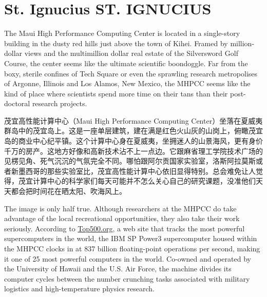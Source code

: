 \chapter{\ifdefined\eng
St. Ignucius
\fi
\ifdefined\chs
ST. IGNUCIUS\fi}
\thispagestyle{empty}
\ifdefined\eng
The Maui High Performance Computing Center is located in a single-story building in the dusty red hills just above the town of Kihei. Framed by million-dollar views and the multimillion dollar real estate of the Silversword Golf Course, the center seems like the ultimate scientific boondoggle. Far from the boxy, sterile confines of Tech Square or even the sprawling research metropolises of Argonne, Illinois and Los Alamos, New Mexico, the MHPCC seems like the kind of place where scientists spend more time on their tans than their post-doctoral research projects.
\fi

\ifdefined\chs
茂宜高性能计算中心（Maui High Performance Computing Center）坐落在夏威夷群岛中的茂宜岛上。这是一座单层建筑，建在满是红色火山灰的山岗上，俯瞰茂宜岛的商业中心纪平镇。这个计算中心身在夏威夷，坐拥迷人的山景海风，更有身价千万的房产。这地方好像和高新技术沾不上一点边。它跟麻省理工学院技术广场的见楞见角、死气沉沉的气氛完全不同。哪怕跟阿尔贡国家实验室，洛斯阿拉莫斯或者新墨西哥的那些实验室比，茂宜高性能计算中心依旧显得特别。总会难免让人觉得，茂宜计算中心的科学家们每天可能并不怎么关心自己的研究课题，没准他们天天都会把时间花在晒太阳、吹海风上。
\fi

\ifdefined\eng
The image is only half true. Although researchers at the MHPCC do take advantage of the local recreational opportunities, they also take their work seriously. According to \url{Top500.org}, a web site that tracks the most powerful supercomputers in the world, the IBM SP Power3 supercomputer housed within the MHPCC clocks in at 837 billion floating-point operations per second, making it one of 25 most powerful computers in the world. Co-owned and operated by the University of Hawaii and the U.S. Air Force, the machine divides its computer cycles between the number crunching tasks associated with military logistics and high-temperature physics research.
\fi

